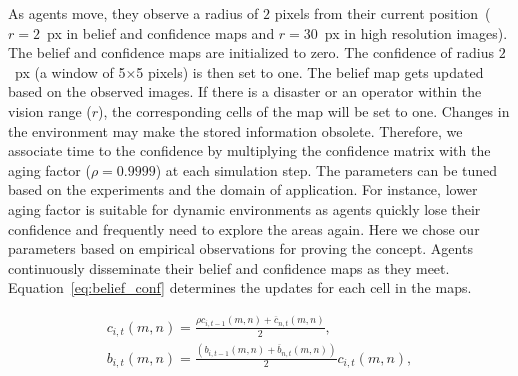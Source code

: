 \documentclass[runningheads]{llncs}%
\begin{document}
As agents move, they observe a radius of $2$ pixels from their current position~($r=2$~px in belief and confidence maps and $r=30$~px in high resolution images). 
The belief and confidence maps are initialized to zero. The confidence of radius $2$~px (a window of 5$\times$5 pixels) is then set to one. The belief map gets updated based on the observed images. If there is a disaster or an operator within the vision range ($r$), the corresponding cells of the map will be set to one.  Changes in the environment may make the stored information obsolete. Therefore, we associate time to the confidence by multiplying the confidence matrix with the aging factor {($\rho =0.9999$)} at each simulation step. The parameters can be tuned based on the experiments and the domain of application. For instance, lower aging factor is suitable for dynamic environments as agents quickly lose their confidence and frequently need to explore the areas again. Here we chose our parameters based on empirical observations for proving the concept.
Agents continuously disseminate their belief and confidence maps as they meet. Equation~\ref{eq:belief_conf} determines the updates for each cell in the maps. 


\begin{equation}
\label{eq:belief_conf}
\begin{gathered}
    c_{i,t}(m,n) = \frac{\rho c_{i,t-1}(m,n) + \overline {c}_{n,t}(m,n)}{2},\\
    b_{i,t}(m,n) = \frac{(b_{i,t-1}(m,n) + \overline {b}_{n,t}(m,n))}{2} c_{i,t}(m,n),
\end{gathered}
\end{equation}
\end{document}
